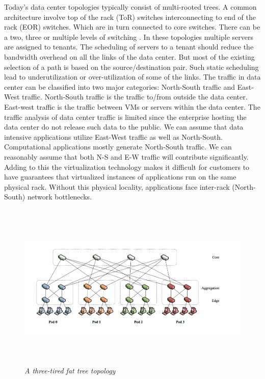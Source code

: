 \documentclass[11pt,letterpaper,onecolumn]{article}
\begin{document}
\par{Today's data center topologies typically consist of multi-rooted trees. A common architecture involve top of the rack (ToR) switches interconnecting to end of the rack (EOR) switches. Which are in turn connected to core switches. There can be a two, three or multiple levels of switching \cite{wang2015survey}. In these topologies multiple servers are assigned to tenants. The scheduling of servers to a tenant should reduce the bandwidth overhead on all the links of the data center. But most of the existing selection of a path is based on the source/destination pair. Such static scheduling lead to underutilization or over-utilization of some of the links. The traffic in data center can be classified into two major categories: North-South traffic and East-West traffic. North-South traffic is the traffic to/from outside the data center. East-west traffic is the traffic between VMs or servers within the data center. The traffic analysis of data center traffic is limited since the enterprise hosting the data center do not release such data to the public\cite{song2009multi}. We can assume that data intensive applications utilize East-West traffic as well as North-South. Computational applications mostly generate North-South traffic. We can reasonably assume that both N-S and E-W traffic will contribute significantly. Adding to this the virtualization technology makes it difficult for customers to have guarantees that virtualized instances of applications run on the same physical rack. Without this physical locality, applications face inter-rack (North-South) network bottlenecks.\cite{al2010hedera}}\\

\begin{figure}
\centering
\includegraphics[width=18cm, height=8cm]{fat_tree.png}
\caption{\textit{A three-tired fat tree topology}}
\label{fig:tree}
\end{figure}
\end{document}
